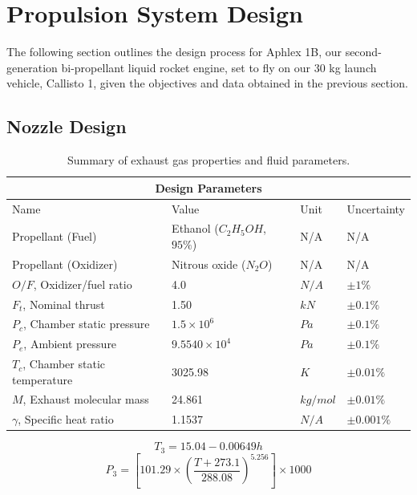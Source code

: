 \documentclass[9pt]{article} %
\numberwithin{equation}{section} %
\begin{document}
\section{Propulsion System Design}
\hspace{\parindent} The following section outlines the design process for Aphlex 1B, our second-generation bi-propellant liquid rocket engine, set to fly on our 30 kg launch vehicle, Callisto 1, given the objectives and data obtained in the previous section.

\subsection{Nozzle Design}

\begin{table}[!htb]
\centering
\begin{tabular}{ |p{5cm}||p{4cm}|p{1cm}|p{2cm}|  }
\hline
\multicolumn{4}{|c|}{Design Parameters} \\
\hline
Name & Value & Unit & Uncertainty \\
\hline
Propellant (Fuel)  &  Ethanol ($C_{2}H_{5}OH$, $95\%$)   &  N/A  &  N/A \\
Propellant (Oxidizer)  &  Nitrous oxide ($N_{2}O$) & N/A  &  N/A \\
$O/F$, Oxidizer/fuel ratio &  4.0  &  $N/A$  &   $\pm 1 \%$ \\
$F_{t}$, Nominal thrust &  1.50 &  $kN$  &  $\pm 0.1 \%$ \\
$P_{c}$, Chamber static pressure &  $1.5 \times 10^{6}$  &  $Pa$  &  $\pm 0.1 \%$ \\
$P_{e}$, Ambient pressure &  $9.5540 \times 10^{4}$  &  $Pa$  &  $\pm 0.1 \%$ \\
$T_{c}$, Chamber static temperature &  3025.98  &  $K$  &  $\pm 0.01 \%$  \\
$M$, Exhaust molecular mass &  24.861  &  $kg/mol$  &   $\pm 0.01 \%$ \\
$\gamma$, Specific heat ratio  &  1.1537  &  $N/A$  &   $\pm 0.001 \%$ \\
\hline
\end{tabular}
\caption{Summary of exhaust gas properties and fluid parameters.}
\label{table:gas_parameters}
\end{table}

\begin{equation} \label{eq:ambient_temperature}
T_{3} = 15.04 - 0.00649 h 
\end{equation}
\begin{equation} \label{eq:ambient_pressure}
P_{3} = \left[101.29 \times \left( \frac{T + 273.1}{288.08} \right) ^ {5.256} \right] \times 1000
\end{equation}
\end{document}
